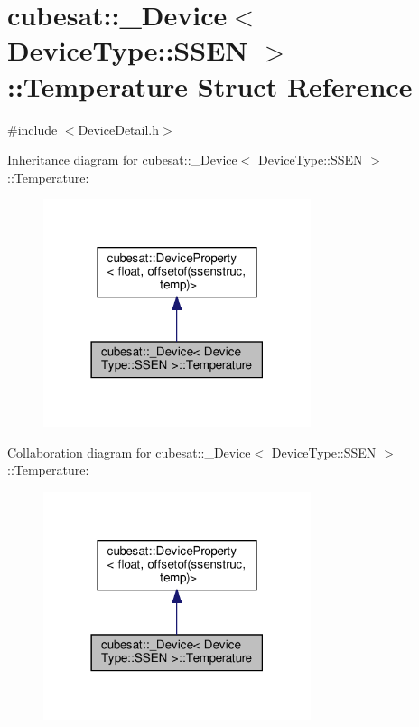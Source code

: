 \hypertarget{structcubesat_1_1__Device_3_01DeviceType_1_1SSEN_01_4_1_1Temperature}{}\section{cubesat\+:\+:\+\_\+\+Device$<$ Device\+Type\+:\+:S\+S\+EN $>$\+:\+:Temperature Struct Reference}
\label{structcubesat_1_1__Device_3_01DeviceType_1_1SSEN_01_4_1_1Temperature}


{\ttfamily \#include $<$Device\+Detail.\+h$>$}



Inheritance diagram for cubesat\+:\+:\+\_\+\+Device$<$ Device\+Type\+:\+:S\+S\+EN $>$\+:\+:Temperature\+:\nopagebreak
\begin{figure}[H]
\begin{center}
\leavevmode
\includegraphics[width=222pt]{structcubesat_1_1__Device_3_01DeviceType_1_1SSEN_01_4_1_1Temperature__inherit__graph}
\end{center}
\end{figure}


Collaboration diagram for cubesat\+:\+:\+\_\+\+Device$<$ Device\+Type\+:\+:S\+S\+EN $>$\+:\+:Temperature\+:\nopagebreak
\begin{figure}[H]
\begin{center}
\leavevmode
\includegraphics[width=222pt]{structcubesat_1_1__Device_3_01DeviceType_1_1SSEN_01_4_1_1Temperature__coll__graph}
\end{center}
\end{figure}
